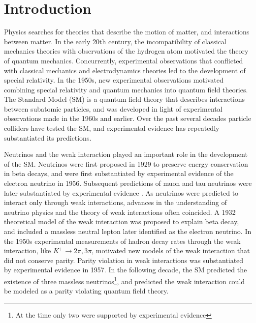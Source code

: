 \chapter{Introduction}
\label{intro_chapter}

Physics searches for theories that describe the motion of matter, and interactions between matter.  
In the early 20th century, the incompatibility of classical mechanics theories with 
observations of the hydrogen atom motivated the theory of quantum mechanics.  Concurrently, experimental 
observations that conflicted with classical mechanics and electrodynamics theories led to the development 
of special relativity.  In the 1950s, new experimental observations motivated combining special 
relativity and quantum mechanics into quantum field theories.  The Standard Model (SM) \cite{weinbergSM,salamSM} 
is a quantum field theory that describes interactions between subatomic particles, and was developed 
in light of experimental observations made in the 1960s and earlier.  Over the past 
several decades particle colliders have tested the SM, and experimental evidence has repeatedly 
substantiated its predictions.

Neutrinos and the weak interaction played an important role in the development of the SM.  
Neutrinos were first proposed in 1929 to preserve energy conservation in beta decays, and were first 
substantiated by experimental evidence \cite{firstNuDiscovery} of the electron neutrino in 1956.  
Subsequent predictions of muon and tau neutrinos were later substantiated 
by experimental evidence \cite{muNuDiscovery,tauNuDiscovery}.  As neutrinos were predicted to interact only through weak 
interactions, advances in the understanding of neutrino physics and the theory of weak interactions often coincided.  
A 1932 theoretical model of the weak interaction was proposed to explain beta decay, and included a massless 
neutral lepton later identified as the electron neutrino.  In the 1950s experimental measurements of 
hadron decay rates through the weak interaction, like $K^{+} \rightarrow 2\pi, 3\pi$, motivated new 
models of the weak interaction that did not conserve parity.  Parity violation in weak interactions was 
substantiated by experimental evidence \cite{weakParityViolation} in 1957.  In the following decade, the 
SM predicted the existence of three massless neutrinos\footnote{At the time only two were supported 
by experimental evidence}, and predicted the weak interaction could be modeled as a parity violating 
quantum field theory.

